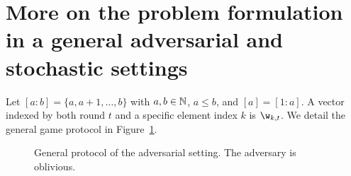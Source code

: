 \section{More on the problem formulation in a general 
	adversarial and stochastic settings}
\label{s:set}
%
Let $[a:b]=\{a,a+1,\ldots,b\}$ with
$a,b\in\mathbb{N}$, $a\leq b$, and $[a]=[1:a]$.
A vector indexed by both round $t$ and a specific element
index $k$ is $\w_{k,t}$. We detail the general game protocol in Figure~\ref{fig:protocol}.
%
%
\begin{figure}[H]
\centering
{}
\caption{General protocol of the adversarial setting. The adversary 
	is oblivious.}\label{fig:protocol}
\end{figure}
%
